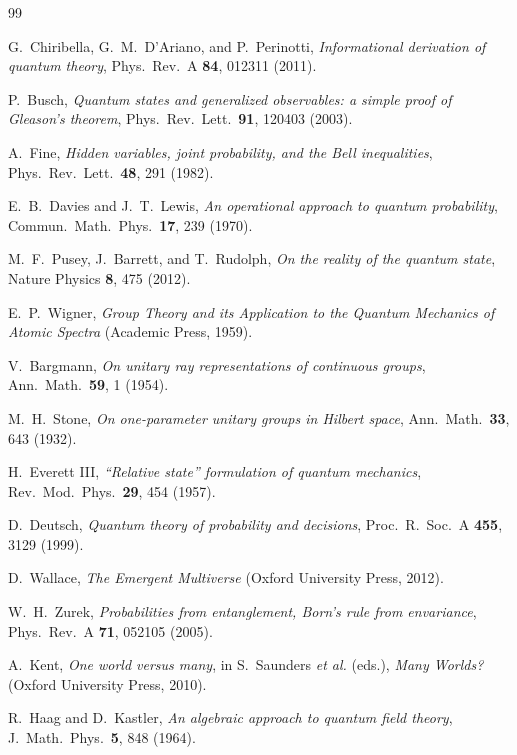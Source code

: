 \documentclass[11pt,a4paper]{article}
\theoremstyle{definition}
\theoremstyle{plain}
\theoremstyle{remark}
\begin{document}
\begin{thebibliography}{99}\small

 G.~Chiribella, G.~M.~D'Ariano, and P.~Perinotti,
\emph{Informational derivation of quantum theory},
Phys.\ Rev.\ A \textbf{84}, 012311 (2011).

 P.~Busch, \emph{Quantum states and generalized
observables: a simple proof of Gleason's theorem},
Phys.\ Rev.\ Lett.\ \textbf{91}, 120403 (2003).

 A.~Fine, \emph{Hidden variables, joint probability, and the
Bell inequalities}, Phys.\ Rev.\ Lett.\ \textbf{48}, 291 (1982).

 E.~B.~Davies and J.~T.~Lewis, \emph{An operational
approach to quantum probability}, Commun.\ Math.\ Phys.\ \textbf{17}, 239
(1970).

 M.~F.~Pusey, J.~Barrett, and T.~Rudolph, \emph{On the
reality of the quantum state}, Nature Physics \textbf{8}, 475 (2012).

 E.~P.~Wigner, \emph{Group Theory and its Application to
the Quantum Mechanics of Atomic Spectra} (Academic Press, 1959).

 V.~Bargmann, \emph{On unitary ray representations of
continuous groups}, Ann.\ Math.\ \textbf{59}, 1 (1954).

 M.~H.~Stone, \emph{On one-parameter unitary groups in
Hilbert space}, Ann.\ Math.\ \textbf{33}, 643 (1932).

 H.~Everett III, \emph{``Relative state'' formulation of
quantum mechanics}, Rev.\ Mod.\ Phys.\ \textbf{29}, 454 (1957).

 D.~Deutsch, \emph{Quantum theory of probability and
decisions}, Proc.\ R.\ Soc.\ A \textbf{455}, 3129 (1999).

 D.~Wallace, \emph{The Emergent Multiverse} (Oxford
University Press, 2012).

 W.~H.~Zurek, \emph{Probabilities from entanglement,
Born's rule from envariance}, Phys.\ Rev.\ A \textbf{71}, 052105 (2005).

 A.~Kent, \emph{One world versus many}, in S.~Saunders
\emph{et al.} (eds.), \emph{Many Worlds?} (Oxford University Press,
2010).

 R.~Haag and D.~Kastler, \emph{An algebraic approach
to quantum field theory}, J.\ Math.\ Phys.\ \textbf{5}, 848 (1964).


\end{thebibliography}
\end{document}
